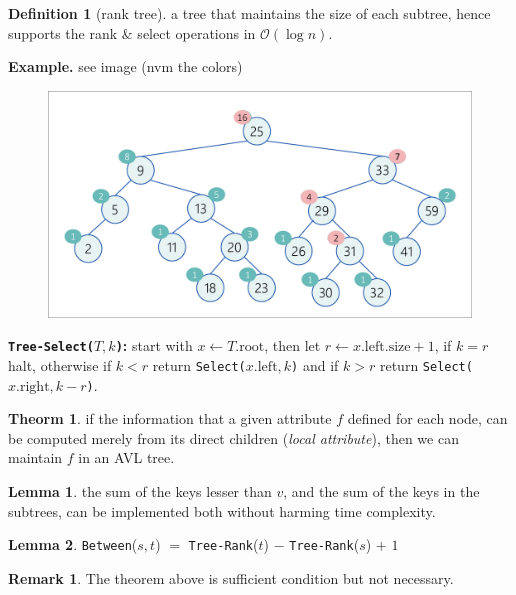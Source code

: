 \documentclass[]{article}
\theoremstyle{definition}
\newtheorem{Theorem}{\color{theoColor}Theorm}
\newtheorem{Definition}{\color{defiColor}Definition}
\newtheorem{Lemma}{\color{lemColor}Lemma}
\newtheorem{Remark}{Remark}
\newcommand\theo  [1] {\begin{Theorem}#1\end{Theorem}}
\newcommand\lem   [1] {\begin{Lemma}#1\end{Lemma}}
\newcommand\oc    {\mathcal{O}}
\newcommand\logn      {\log n}
\begin{document}
\begin{multicols}{4}
				\begin{Definition}[rank tree]
					a tree that maintains the size of each subtree, hence supports the rank \& select operations in $\oc(\logn)$. 
				\end{Definition}
				\textbf{Example. }see image (nvm the colors)
				\begin{figure}
					\includegraphics[width=\linewidth]{images/rankTreeExample}
				\end{figure}
				\textbf{\texttt{Tree-Select($T, k$)}: }start with $x \gets T.\mathrm{root}$, then let $r \gets x.\mathrm{left}.\mathrm{size} + 1$, if $k = r$ halt, otherwise if $k < r$ return \texttt{Select($x.\mathrm{left}, k$)} and if $k > r$ return \texttt{Select($x.\mathrm{right}, k - r$)}. 
				\theo{if the information that a given attribute $f$ defined for each node, can be computed merely from its direct children (\textit{local attribute}), then we can maintain $f$ in an AVL tree. }
				\lem{the sum of the keys lesser than $v$, and the sum of the keys in the subtrees, can be implemented both without harming time complexity. }
				\lem{\texttt{Between}($s, t$) $=$ \texttt{Tree-Rank}($t$) $-$ \texttt{Tree-Rank}($s$) $+$ $1$}
				
				\begin{Remark}
					The theorem above is sufficient condition but not necessary. 
				\end{Remark}
				

\end{multicols}
\end{document}
